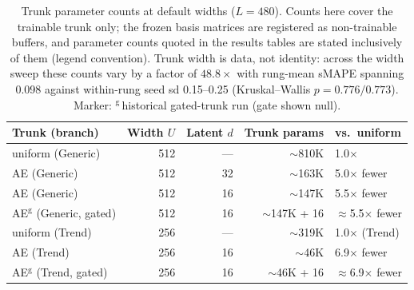 
\begin{table}[h]
  \caption{Trunk parameter counts at default widths ($L = 480$). Counts
  here cover the trainable trunk only; the frozen basis matrices are
  registered as non-trainable buffers, and parameter counts quoted in the
  results tables are stated inclusively of them (legend convention).
  Trunk width is data, not identity: across the width sweep these counts
  vary by a factor of $48.8\times$ with rung-mean sMAPE spanning 0.098
  against within-rung seed sd 0.15--0.25 (Kruskal--Wallis
  $p = 0.776/0.773$). Marker: $^{\mathrm{g}}$\,historical gated-trunk run
  (gate shown null).}
  \label{tab:param-counts}
  \centering
  \begin{tabular}{lrrrl}
    \toprule
    Trunk (branch) & Width $U$ & Latent $d$ & Trunk params & vs.\ uniform \\
    \midrule
    uniform (Generic)        & 512 & ---  & $\sim$810K          & 1.0$\times$ \\
    AE (Generic)             & 512 & 32   & $\sim$163K          & 5.0$\times$ fewer \\
    AE (Generic)             & 512 & 16   & $\sim$147K          & 5.5$\times$ fewer \\
    AE$^{\mathrm{g}}$ (Generic, gated) & 512 & 16 & $\sim$147K + 16 & $\approx$5.5$\times$ fewer \\
    uniform (Trend)          & 256 & ---  & $\sim$319K          & 1.0$\times$ (Trend) \\
    AE (Trend)               & 256 & 16   & $\sim$46K           & 6.9$\times$ fewer \\
    AE$^{\mathrm{g}}$ (Trend, gated)   & 256 & 16 & $\sim$46K + 16 & $\approx$6.9$\times$ fewer \\
    \bottomrule
  \end{tabular}
\end{table}